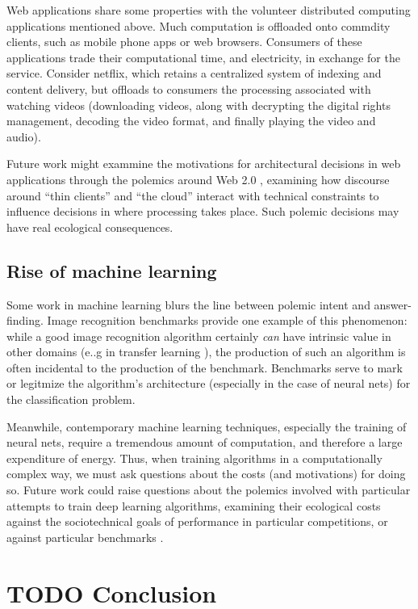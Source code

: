 \documentclass[sigconf]{acmart}
\begin{document}
Web applications share some properties with the volunteer distributed computing applications mentioned above.
Much computation is offloaded onto commdity clients, such as mobile phone apps or web browsers.
Consumers of these applications trade their computational time, and electricity, in exchange for the service.
Consider netflix, which retains a centralized system of indexing and content delivery,
but offloads to consumers the processing associated with watching videos 
(downloading videos, along with decrypting the digital rights management, decoding the video format, and finally playing the video and audio).

Future work might exammine the motivations for architectural decisions in web applications through 
the polemics around Web 2.0 
\cite{Scholz2008},
examining how discourse around ``thin clients'' and ``the cloud''
interact with technical constraints
to influence decisions in where processing takes place.
Such polemic decisions may have real ecological consequences.


\subsection{Rise of machine learning}
\label{sec:orgdd53a39}

Some work in machine learning blurs the line 
between polemic intent and answer-finding.
Image recognition benchmarks provide one example of this phenomenon:
while a good image recognition algorithm certainly \emph{can} have intrinsic value in other domains 
(e..g in transfer learning \cite{Jean2016c}),
the production of such an algorithm is often incidental to the production of the benchmark.
Benchmarks serve to mark or legitmize the algorithm's architecture (especially in the case of neural nets)
for the classification problem.

Meanwhile, contemporary machine learning techniques, especially the training of neural nets, 
require a tremendous amount of computation, and therefore a large expenditure of energy.
Thus, when training algorithms in a computationally complex way,
we must ask questions about the costs (and motivations) for doing so.
Future work could raise questions about the polemics involved
with particular attempts to train deep learning algorithms,
examining their ecological costs against the sociotechnical goals 
of performance in particular competitions, or against particular benchmarks \cite{SixSilberman2015}.


\section{{\bfseries\sffamily TODO} Conclusion}
\label{sec:org6f7ca21}
\end{document}
